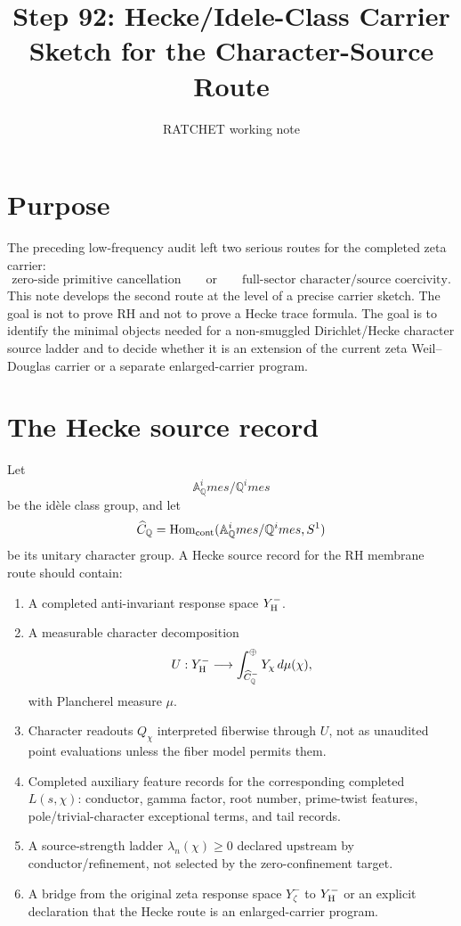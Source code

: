 \documentclass[11pt]{article}
\title{Step 92: Hecke/Idele-Class Carrier Sketch for the Character-Source Route}
\author{RATCHET working note}
\date{}
\begin{document}
\maketitle

\section{Purpose}
The preceding low-frequency audit left two serious routes for the completed zeta carrier:
\[
\text{zero-side primitive cancellation}
\qquad\text{or}\qquad
\text{full-sector character/source coercivity}.
\]
This note develops the second route at the level of a precise carrier sketch.  The goal is not to prove RH and not to prove a Hecke trace formula.  The goal is to identify the minimal objects needed for a non-smuggled Dirichlet/Hecke character source ladder and to decide whether it is an extension of the current zeta Weil--Douglas carrier or a separate enlarged-carrier program.

\section{The Hecke source record}
Let
\[
\mathbb A_\mathbb Q^	imes/\mathbb Q^	imes
\]
be the id\`ele class group, and let
\[
\widehat{C}_{\mathbb Q}=\operatorname{Hom}_{\rm cont}(\mathbb A_\mathbb Q^	imes/\mathbb Q^	imes,S^1)
\]
be its unitary character group.  A Hecke source record for the RH membrane route should contain:
\begin{enumerate}[label=\textbf{H\arabic*.}]
\item A completed anti-invariant response space \(Y^-_{\rm H}\).
\item A measurable character decomposition
\[
U:Y^-_{\rm H}\longrightarrow
\int_{\widehat{C}_{\mathbb Q}^{-}}^{\oplus}Y_\chi\,d\mu(\chi),
\]
with Plancherel measure \(\mu\).
\item Character readouts \(Q_\chi\) interpreted fiberwise through \(U\), not as unaudited point evaluations unless the fiber model permits them.
\item Completed auxiliary feature records for the corresponding completed \(L(s,\chi)\): conductor, gamma factor, root number, prime-twist features, pole/trivial-character exceptional terms, and tail records.
\item A source-strength ladder \(\lambda_n(\chi)\ge0\) declared upstream by conductor/refinement, not selected by the zero-confinement target.
\item A bridge from the original zeta response space \(Y^-_\zeta\) to \(Y^-_{\rm H}
\) or an explicit declaration that the Hecke route is an enlarged-carrier program.
\end{enumerate}
\end{document}
